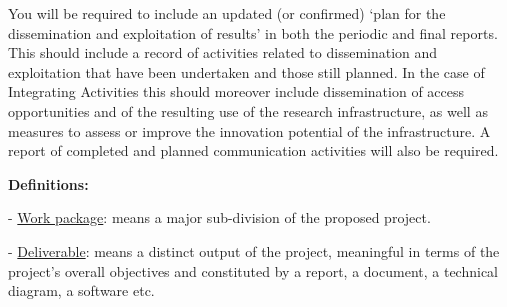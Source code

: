 \begin{todo}{}
  You will be required to include an updated (or confirmed) ‘plan for the dissemination and exploitation of results’ in both the periodic and final reports. This should include a record of activities related to dissemination and exploitation that have been undertaken and those still planned. In the case of Integrating Activities this should moreover include dissemination of access opportunities and of the resulting use of the research infrastructure, as well as measures to assess or improve the innovation potential of the infrastructure. A report of completed and planned communication activities will also be required.

  {\bf Definitions:}

  - \underline{Work package}: means a major sub-division of the proposed project.

  - \underline{Deliverable}: means a distinct output of the project, meaningful in terms of the project's overall objectives and constituted by a report, a document, a technical diagram, a software etc.
\end{todo}

